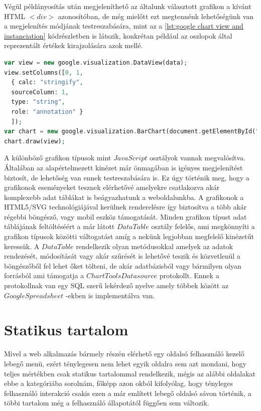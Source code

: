 \documentclass[12pt]{report}
\theoremstyle{definition}
\begin{document}
	Végül példányosítás után megjeleníthető az általunk választott grafikon a kívánt HTML $<div>$ azonosítóban, de még mielőtt ezt megtennénk lehetőségünk van a megjelenítés módjának testreszabására, mint az a \ref{lst:google chart view and instanciation} kódrészletben is látszik, konkrétan például az oszlopok által reprezentált értékek kirajzolására azok mellé. 
	
	\noindent\begin{minipage}{\linewidth}
		\begin{lstlisting}[language=php,label={lst:google chart view and instanciation}, caption={Google Charts megjelenítésének beállítása és a példányosított objektum beszúrása a megfelelő $<div>$-be}]
var view = new google.visualization.DataView(data);
view.setColumns([0, 1,
  { calc: "stringify",
  sourceColumn: 1,
  type: "string",
  role: "annotation" }
  ]);
var chart = new google.visualization.BarChart(document.getElementById("graph"));
chart.draw(view);
		\end{lstlisting}
	\end{minipage}
	
	A különböző grafikon típusok mint $JavaScript$ osztályok vannak megvalósítva. Általában az alapértelmezett kinézet már önmagában is igényes megjelenítést biztosít, de lehetőség van ennek testreszabására is. Ez úgy történik meg, hogy a grafikonok eseményeket tesznek elérhetővé amelyekre csatlakozva akár komplexebb adat táblákat is beágyazhatunk a weboldalunkba. A grafikonok a HTML5/SVG technológiájával kerülnek renderelésre így biztosítva a több akár régebbi böngésző, vagy mobil eszköz támogatását. Minden grafikon típust adat táblájának feltöltéséért a már látott $DataTable$ osztály felelős, ami megkönnyíti a grafikon típusok közötti váltogatást amíg a nekünk legjobban megfelelő kinézetűt keressük. A $DataTable$ rendelkezik olyan metódusokkal amelyek az adatok rendezését, módosítását vagy akár szűrését is lehetővé teszik és közvetlenül a böngészőből fel lehet őket tölteni, de akár adatbázisból vagy bármilyen olyan forrásból ami támogatja a $Chart Tools Datasource$ protokollt. Ennek a protokollnak van egy SQL szerű lekérdező nyelve amely többek között az $Google Spreadsheet$ -ekben is implementálva van.
	
	\section{Statikus tartalom}
	
	Mivel a web alkalmazás bármely részén elérhető egy oldalsó felhasználó kezelő lebegő menü, ezért ténylegesen nem lehet egyik oldalra sem azt mondani, hogy teljes mértékben csak statikus tartalommal rendelkezik, mégis az alábbi oldalakat ebbe a kategóriába sorolnám, főképp azon okból kifolyólag, hogy tényleges felhasználó interakció csakis ezen a már említett lebegő oldalsó  sávon történik, a többi tartalom még a felhasználó állapotától függően sem változik.
	
\end{document}
